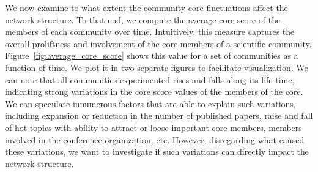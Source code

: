 We now examine to what extent the community core fluctuations affect the network structure.  To that end, we compute the average core score of the members of each community over
time. Intuitively, this measure captures the overall proliftness and involvement of the core members of a scientific community. Figure~\ref{fig:average_core_score} shows this value
for a set of communities as a function of time. We plot it in two separate figures to facilitate visualization. We can note that all communities experimented rises and falls along
its life time, indicating strong variations in the core score values of the members of the core. We can speculate innumerous factors that are able to explain such variations,
including expansion or reduction in the number of published papers, raise and fall of hot topics with ability to attract or loose important core members, members involved in the
conference organization, etc. However, disregarding what caused these variations, we want to investigate if such variations can directly impact the network structure.


